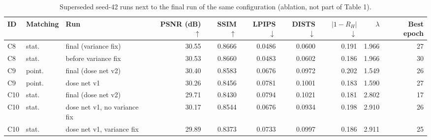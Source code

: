 \begin{table}[t]
\centering
\footnotesize
\setlength{\tabcolsep}{3pt}
\caption{Superseded seed-42 runs next to the final run of the same configuration (ablation, not part of Table 1).}
\label{tab:ablation}
\begin{tabular}{lllrrrrrrr}
\toprule
ID & Matching & Run & PSNR (dB) $\uparrow$ & SSIM $\uparrow$ & LPIPS $\downarrow$ & DISTS $\downarrow$ & $|1-R_H|$ $\downarrow$ & $\lambda$ & Best epoch \\
\midrule
C8 & stat. & final (variance fix) & 30.55 & 0.8666 & 0.0486 & 0.0600 & 0.191 & 1.966 & 27 \\
C8 & stat. & before variance fix & 30.53 & 0.8660 & 0.0483 & 0.0602 & 0.186 & 1.966 & 30 \\
C9 & point. & final (dose net v2) & 30.40 & 0.8583 & 0.0676 & 0.0972 & 0.202 & 1.549 & 26 \\
C9 & point. & dose net v1 & 30.26 & 0.8456 & 0.0781 & 0.1001 & 0.183 & 1.590 & 27 \\
C10 & stat. & final (dose net v2) & 29.71 & 0.8430 & 0.0794 & 0.1021 & 0.181 & 2.802 & 17 \\
C10 & stat. & dose net v1, no variance fix & 30.17 & 0.8544 & 0.0676 & 0.0934 & 0.198 & 2.910 & 26 \\
C10 & stat. & dose net v1, variance fix & 29.89 & 0.8373 & 0.0733 & 0.0997 & 0.186 & 2.911 & 25 \\
\bottomrule
\end{tabular}
\end{table}
